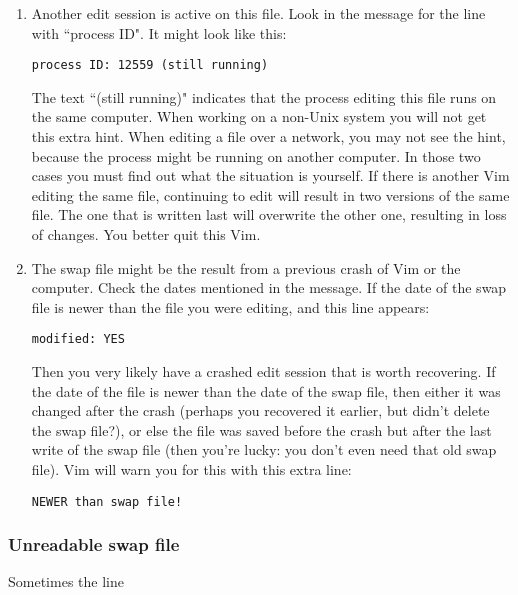 \begin{enumerate}
				\item Another edit session is active on this file.  Look in the message for the line with ``process ID".  It might look like this:

								\begin{Verbatim}[samepage=true]
				process ID: 12559 (still running)
								\end{Verbatim}

								The text ``(still running)" indicates that the process editing this file runs on the same computer.
								When working on a non-Unix system you will not get this extra hint.
								When editing a file over a network, you may not see the hint, because the process might be running on another computer.
								In those two cases you must find out what the situation is yourself.
								If there is another Vim editing the same file, continuing to edit will result in two versions of the same file.
								The one that is written last will overwrite the other one, resulting in loss of changes.
								You better quit this Vim.

				\item The swap file might be the result from a previous crash of Vim or the
								computer.  Check the dates mentioned in the message.  If the date of the
								swap file is newer than the file you were editing, and this line appears:

								\begin{Verbatim}[samepage=true]
				modified: YES
								\end{Verbatim}

								Then you very likely have a crashed edit session that is worth recovering.
								If the date of the file is newer than the date of the swap file, then either it was changed after the crash (perhaps you recovered it earlier, but didn't delete the swap file?), or else the file was saved before the crash but after the last write of the swap file (then you're lucky: you don't even need that old swap file).
								Vim will warn you for this with this extra line:

								\begin{Verbatim}[samepage=true]
			NEWER than swap file!
								\end{Verbatim}
\end{enumerate}

\subsubsection{Unreadable swap file}
Sometimes the line

